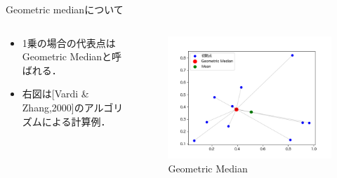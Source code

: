 \documentclass[unicode,11pt]{beamer}
\begin{document}
\begin{frame}{Geometric medianについて}
    \begin{columns}
        \begin{column}{0.48\textwidth}
            \begin{itemize}
                \item 1乗の場合の代表点はGeometric Medianと呼ばれる．
                \item 右図は[Vardi \& Zhang,2000]のアルゴリズムによる計算例．
            \end{itemize}
        \end{column}
        \begin{column}{0.48\textwidth}
            \begin{figure}
                \centering
                \includegraphics[keepaspectratio, scale = 0.35]{Geometric_Median.png}
                \caption{Geometric Median}
                \label{Geometric_Median}
            \end{figure}
        \end{column}
    \end{columns}
\end{frame}
\end{document}
